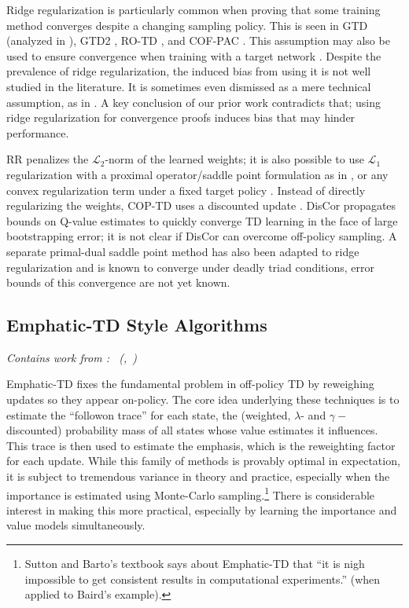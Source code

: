 \documentclass[11pt]{article}
\newcommand{\subsectionsubtitle}[1]{\vspace{-0.5em}\textit{#1}\vspace{0.5em}}
\begin{document}
Ridge regularization is particularly common when proving that some training method converges despite a changing sampling policy. This is seen in GTD (analyzed in \cite{yu2017convergence}), GTD2 \cite{sutton2009fast}, RO-TD \cite{mahadevan2014proximal}, and COF-PAC \cite{zhang2020provably}. This assumption may also be used to ensure convergence when training with a target network \cite{zhang2021breaking}. Despite the prevalence of ridge regularization, the induced bias from using it is not well studied in the literature. It is sometimes even dismissed as a mere technical assumption, as in \cite{diddigi2019convergent}. A key conclusion of our prior work contradicts that; using ridge regularization for convergence proofs induces bias that may hinder performance.

RR penalizes the $\mathcal L_2$-norm of the learned weights; it is also possible to use $\mathcal L_1$ regularization with a proximal operator/saddle point formulation as in \cite{mahadevan2014proximal}, or any convex regularization term under a fixed target policy \cite{yu2017convergence}. Instead of directly regularizing the weights, COP-TD uses a discounted update \cite{gelada2019off}. DisCor \cite{kumar2020discor} propagates bounds on Q-value estimates to quickly converge TD learning in the face of large bootstrapping error; it is not clear if DisCor can overcome off-policy sampling. A separate primal-dual saddle point method has also been adapted to ridge regularization \cite{du2017stochastic} and is known to converge under deadly triad conditions, error bounds of this convergence are not yet known.


\subsection{Emphatic-TD Style Algorithms}
\subsectionsubtitle{Contains work from \cite{manek2022pitfalls}: \citetitle{manek2022pitfalls}~(\citeauthor{manek2022pitfalls},~\citeyear{manek2022pitfalls})}

Emphatic-TD \cite{sutton2016emphatic} fixes the fundamental problem in off-policy TD by reweighing updates so they appear on-policy. The core idea underlying these techniques is to estimate the ``followon trace'' for each state, the (weighted, $\lambda$- and $\gamma-$discounted) probability mass of all states whose value estimates it influences. This trace is then used to estimate the emphasis, which is the reweighting factor for each update. While this family of methods is provably optimal in expectation, it is subject to tremendous variance in theory and practice, especially when the importance is estimated using Monte-Carlo sampling.\footnote{Sutton and Barto's textbook \citeyearpar{sutton2020reinforcement} says about Emphatic-TD that ``it is
nigh impossible to get consistent results in computational experiments.'' (when applied to Baird's example). } 
There is considerable interest in making this more practical, especially by learning the importance and value models simultaneously.
\end{document}
